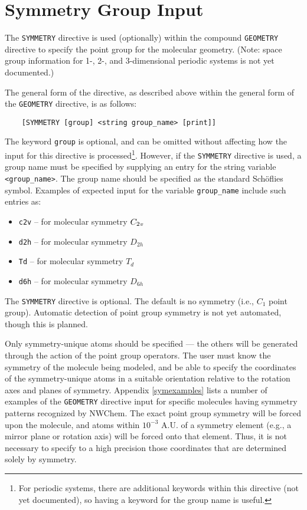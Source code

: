 \section{Symmetry Group Input}

The \verb+SYMMETRY+ directive is used (optionally) within the compound
\verb+GEOMETRY+ directive to specify the point group for the molecular
geometry. (Note: space group information for 1-, 2-, and 3-dimensional
periodic systems is not yet documented.)

The general form of the directive, as described above within the general
form of the \verb+GEOMETRY+ directive, is as follows:
\begin{verbatim}
    [SYMMETRY [group] <string group_name> [print]]
\end{verbatim}
The keyword \verb+group+ is optional, and can be omitted without
affecting how the input for this directive is processed\footnote{For
  periodic systems, there are additional keywords within this
  directive (not yet documented), so having a keyword for the group
  name is useful.}.  However, if the \verb+SYMMETRY+ directive is
used, a group name must be specified by supplying an entry for the
string variable \verb+<group_name>+.  The group name should be
specified as the standard Sch\"{o}flies symbol.  Examples of expected
input for the variable \verb+group_name+ include such entries as:

\begin{itemize}
\item \verb+c2v+ -- for molecular symmetry $C_{2{\it v}}$
\item \verb+d2h+ -- for molecular symmetry $D_{2h}$
\item \verb+Td+ -- for molecular symmetry $T_d$
\item \verb+d6h+ -- for molecular symmetry $D_{6h}$
\end{itemize}

The \verb+SYMMETRY+ directive is optional.  The default is no symmetry 
(i.e., $C_1$ point group). Automatic detection of point
group symmetry is not yet automated, though this is planned.

Only symmetry-unique atoms should be specified --- the others will be
generated through the action of the point group operators.  The user
must know the symmetry of the molecule being modeled, and be able to
specify the coordinates of the symmetry-unique atoms in a suitable
orientation relative to the rotation axes and planes of symmetry.
Appendix \ref{symexamples} lists a number of examples of the
\verb+GEOMETRY+ directive input for specific molecules having symmetry
patterns recognized by NWChem.  The exact point group symmetry will be
forced upon the molecule, and atoms within $10^{-3}$ A.U. of a
symmetry element (e.g., a mirror plane or rotation axis) will be
forced onto that element.  Thus, it is not necessary to specify to a
high precision those coordinates that are determined solely by
symmetry.

